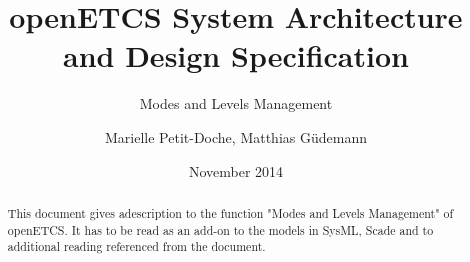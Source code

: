 \documentclass{template/openetcs_report}
\begin{document}
\frontmatter
{}

\newcommand{\define}[1]{\index{#1}\emph{#1}}







%




\title{openETCS System Architecture and Design Specification }

\subtitle{Modes and Levels Management}

\date{November 2014}



\techassessoraffil{[affiliation]}





\author{Marielle Petit-Doche, Matthias Güdemann}






\begin{abstract}
This document gives adescription to the function "Modes and Levels Management" of openETCS. It has to be read as an add-on to the models in SysML, Scade and to additional reading referenced from the document.
\end{abstract}

\maketitle
\end{document}
